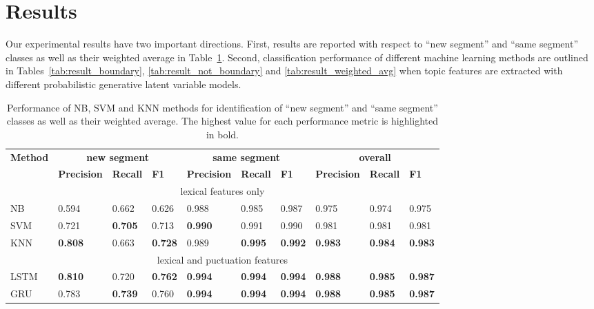 \documentclass{amia}
\begin{document}
\section*{Results}
Our experimental results have two important directions. First, results are reported with respect to ``new segment'' and ``same segment'' classes as well as their weighted average in Table~\ref{tab:result_base}. Second, classification performance of different machine learning methods are outlined in Tables~\ref{tab:result_boundary}, \ref{tab:result_not_boundary} and \ref{tab:result_weighted_avg} when topic features are extracted with different probabilistic generative latent variable models.\\

\begin{table}[ht]
\centering
\caption{Performance of NB, SVM and KNN methods for identification of ``new segment'' and ``same segment'' classes as well as their weighted average. The highest value for each performance metric is highlighted in bold.}
\label{tab:result_base}
  \begin{tabular}{|l|l|l|l|l|l|l|l|l|l|}
  \hline
   \multirow{2}{*}{\textbf{Method}} & \multicolumn{3}{|c|}{\textbf{new segment}} & \multicolumn{3}{|c|}{\textbf{same segment}}  & \multicolumn{3}{|c|}{\textbf{overall}} \\\cline{2-10}
   & \textbf{Precision}  & \textbf{Recall} & \textbf{F1} & \textbf{Precision}  & \textbf{Recall} & \textbf{F1} & \textbf{Precision}  & \textbf{Recall} & \textbf{F1}\\ \hline    
 \multicolumn{10}{|c|}{lexical features only} \\ \hline   
 NB & 0.594 & 0.662 & 0.626 & 0.988 & 0.985 & 0.987 & 0.975 & 0.974 & 0.975  \\ \hline
 SVM & 0.721 & \textbf{0.705} & 0.713 & \textbf{0.990} & 0.991 & 0.990  & 0.981 & 0.981 & 0.981 \\ \hline
 KNN & \textbf{0.808} & 0.663 & \textbf{0.728} & 0.989 & \textbf{0.995} & \textbf{0.992} & \textbf{0.983} & \textbf{0.984} & \textbf{0.983} \\ \hline
 \multicolumn{10}{|c|}{lexical and puctuation features} \\ \hline
 LSTM & \textbf{0.810} & 0.720 & \textbf{0.762}  & \textbf{0.994} & \textbf{0.994} & \textbf{0.994} & \textbf{0.988} & \textbf{0.985} & \textbf{0.987} \\ \hline
 GRU & 0.783 & \textbf{0.739} & 0.760 & \textbf{0.994} & \textbf{0.994} & \textbf{0.994} & \textbf{0.988} & \textbf{0.985} & \textbf{0.987} \\ \hline
  \end{tabular}
\end{table}                 
\end{document}
